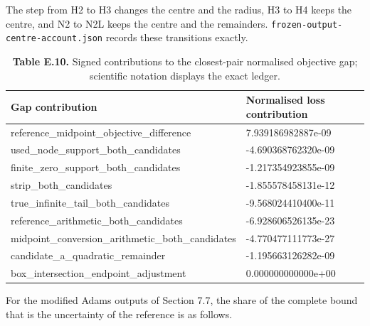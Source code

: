 \documentclass[11pt,a4paper]{article}
\newcommand{\code}[1]{\texttt{\small #1}}
\begin{document}
The step from H2 to H3 changes the centre and the radius, H3 to H4 keeps the centre, and N2 to N2L keeps the centre and the remainders. \code{frozen-\allowbreak{}output-\allowbreak{}centre-\allowbreak{}account.\allowbreak{}json} records these transitions exactly.

\begin{table}[H]
\caption*{\textbf{Table E.10.} Signed contributions to the closest-pair normalised objective gap; scientific notation displays the exact ledger.}
\centering\small
\begin{tabular}{@{}ll@{}}
\toprule
Gap contribution & Normalised loss contribution \\
\midrule
reference\_midpoint\_objective\_difference & 7.939186982887e-09 \\
used\_node\_support\_both\_candidates & -4.690368762320e-09 \\
finite\_zero\_support\_both\_candidates & -1.217354923855e-09 \\
strip\_both\_candidates & -1.855578458131e-12 \\
true\_infinite\_tail\_both\_candidates & -9.568024410400e-11 \\
reference\_arithmetic\_both\_candidates & -6.928606526135e-23 \\
midpoint\_conversion\_arithmetic\_both\_candidates & -4.770477111773e-27 \\
candidate\_a\_quadratic\_remainder & -1.195663126282e-09 \\
box\_intersection\_endpoint\_adjustment & 0.000000000000e+00 \\
\bottomrule
\end{tabular}
\end{table}

For the modified Adams outputs of Section 7.7, the share of the complete bound that is the uncertainty of the reference is as follows.
\end{document}
